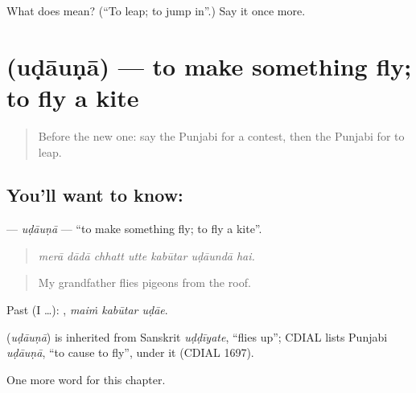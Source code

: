 \begin{tcolorbox}[breakable,colback=teal!4,colframe=teal!35!black,title={Before you move on}]
What does  mean? (\textquotedblleft{}To leap; to jump in\textquotedblright{}.) Say it once more.
\end{tcolorbox}
\section[\texorpdfstring{\pa{ਉਡਾਉਣਾ} (uḍāuṇā)}{ਉਡਾਉਣਾ (uḍāuṇā)}]{ (uḍāuṇā) — to make something fly; to fly a kite}

\label{lesson:PA-C353-udauna}



\begin{quote}
Before the new one: say the Punjabi for a contest, then the Punjabi for to leap.
\end{quote}

\subsection*{You'll want to know: }
\textbf{} — \emph{uḍāuṇā} — \textquotedblleft{}to make something fly; to fly a kite\textquotedblright{}.

\begin{quote}
      
\end{quote}

\begin{quote}
\emph{merā dādā chhatt utte kabūtar uḍāundā hai.}
\end{quote}

\begin{quote}
My grandfather flies pigeons from the roof.
\end{quote}

Past (I …):   , \emph{maiṁ kabūtar uḍāe}.

\begin{cousinweb}
\textbf{} (\emph{uḍāuṇā}) is inherited from Sanskrit \emph{uḍḍīyate}, \textquotedblleft{}flies up\textquotedblright{}; CDIAL lists Punjabi \emph{uḍāuṇā}, \textquotedblleft{}to cause to fly\textquotedblright{}, under it (CDIAL 1697).
\end{cousinweb}

\begin{grammarlens}[title={What you've built}]
One more word for this chapter.
\end{grammarlens}


